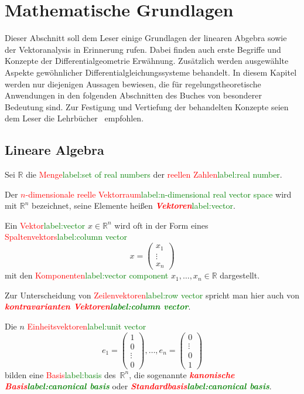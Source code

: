\documentclass[a4paper,twoside,english,ngerman,deutsch,german,sectrefs,envcountsame,envcountchap]{svmono}
\newcommand{\setref}[2]{\textcolor{red}{#1}\textcolor{green}{#2}}
\begin{document}
\chapter{Mathematische Grundlagen\label{cha:Grundlagen}}
Dieser Abschnitt soll dem Leser einige Grundlagen der linearen Abgebra sowie der Vektoranalysis in Erinnerung rufen. Dabei finden auch erste Begriffe und Konzepte der Differentialgeometrie Erwähnung. Zusätzlich werden ausgewählte Aspekte gewöhnlicher Differentialgleichungssysteme behandelt. In diesem Kapitel werden nur diejenigen Aussagen bewiesen, die für regelungstheoretische Anwendungen in den folgenden Abschnitten des Buches von besonderer Bedeutung sind. Zur Festigung und Vertiefung der behandelten Konzepte seien dem Leser die Lehrbücher~\cite{arnold2001,kerner2007} empfohlen.


\section{Lineare Algebra\label{sec:Lineare-Algebra}}

Sei $\mathbb{R}$ die \setref{Menge}{label:set of real numbers} der \setref{reellen Zahlen}{label:real number}.

Der \setref{$n$-dimensionale reelle Vektorraum}{label:n-dimensional real vector space} wird mit ${\mathbb{R}}^{n}$ bezeichnet, seine Elemente heißen \setref{\textbf{\em Vektoren}}{label:vector}.

Ein \setref{Vektor}{label:vector} $x\in{\mathbb{R}}^{n}$ wird oft in der Form eines \setref{Spaltenvektors}{label:column vector}
\begin{equation}
x=\left(\begin{array}{c} x_{1}\\
\vdots\\
x_{n}
\end{array}\right)\label{eq:vektor-x}
\end{equation}
mit den \setref{Komponenten}{label:vector component} $x_{1},\ldots,x_{n}\in{\mathbb{R}}$ dargestellt.

Zur Unterscheidung von \setref{Zeilenvektoren}{label:row vector} spricht man hier auch von \textbf{\em \setref{kontravarianten Vektoren}{label:column vector}}.

Die $n$ \setref{Einheitsvektoren}{label:unit vector}
\[
e_{1}=\left(\begin{array}{c} 1\\ 0\\
\vdots\\
0
\end{array}\right),\ldots,e_{n}=\left(\begin{array}{c}
0\\
\vdots\\
0\\ 1
\end{array}\right)
\]
bilden eine \setref{Basis}{label:basis} des~${\mathbb{R}}^{n}$, die sogenannte \textbf{\em \setref{kanonische Basis}{label:canonical basis}} oder \textbf{\em \setref{Standardbasis}{label:canonical basis}}.
\end{document}
